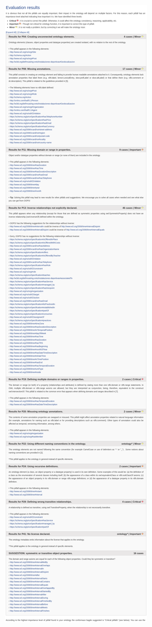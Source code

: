 \documentclass[a4paper,12pt]{article}
\begin{document}
	
	\begin{figure}[H]
		\begin{subfigure}{.5\textwidth}
			\centering
			\includegraphics[height=\textheight]{include/eval_inicial_oops.png}

\end{subfigure}
\end{figure}
\end{document}

